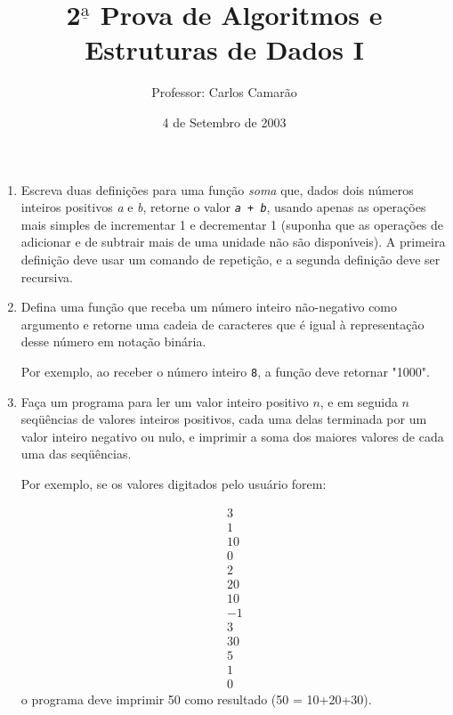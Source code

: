 \documentclass{article}
\title{2$^{\underline{\mbox{a}}}$ Prova de Algoritmos e Estruturas de Dados I}
\author{Professor: Carlos Camar\~ao}
\date{4 de Setembro de 2003}
\begin{document}
\maketitle
\thispagestyle{empty}

\begin{enumerate}

\item Escreva duas defini\c{c}\~oes para uma fun\c{c}\~ao {\it soma\/}
que, dados dois n\'u\-me\-ros inteiros positivos {\it a\/} e {\it
b\/}, retorne o valor \mbox{\tt {\it a\/} + {\it b\/}}, usando apenas as
opera\c{c}\~oes mais simples de incrementar 1 e decrementar 1 (suponha
que as opera\c{c}\~oes de adicionar e de subtrair mais de uma unidade
n\~ao s\~ao dispon\'{\i}veis). A primeira defini\c{c}\~ao deve usar um
comando de repeti\c{c}\~ao, e a segunda defini\c{c}\~ao deve ser
recursiva.

\item Defina uma fun\c{c}\~ao que receba um n\'umero inteiro
n\~ao-negativo como argumento e retorne uma cadeia de ca\-rac\-te\-res
que \'e igual \`a representa\c{c}\~ao desse n\'umero em nota\c{c}\~ao
bin\'aria.

Por exemplo, ao receber o n\'umero inteiro {\tt 8}, a fun\c{c}\~ao
deve retornar  \ttfamily "1000"\normalfont.

\item Fa\c{c}a um programa para ler um valor inteiro positivo $n$, e
em seguida $n$ seq\"u\^encias de valores inteiros positivos, cada uma
delas terminada por um valor inteiro negativo ou nulo, e imprimir a
soma dos maiores valores de cada uma das seq\"u\^encias.

Por exemplo, se os valores digitados pelo usu\'ario forem:
  
  \[ \begin{array}{l}
        3    \\
        1    \\
        10   \\
        0    \\
        2    \\
        20   \\
        10   \\
        -1   \\
        3    \\ 
        30   \\
        5    \\
        1    \\
        0    
      \end{array} \]
o programa deve imprimir 50 como resultado (50 = 10+20+30).


\end{enumerate}
\end{document}
